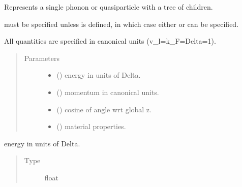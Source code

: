 \documentclass[letterpaper,10pt,english]{sphinxmanual}
\begin{document}
\begin{fulllineitems}
\label{\detokenize{code_structure:scdc.particle.Particle}}
Represents a single phonon or quasiparticle with a tree of children.

 must be specified unless  is defined, in
which case either  or  can be specified.

All quantities are specified in canonical units (v\_l=k\_F=Delta=1).
\begin{quote}\begin{description}
\item[{Parameters}] \leavevmode\begin{itemize}
\item {} 
 (\sphinxstyleliteralemphasis{\sphinxupquote{, }}) \textendash{} energy in units of Delta.

\item {} 
 (\sphinxstyleliteralemphasis{\sphinxupquote{, }}) \textendash{} momentum in canonical units.

\item {} 
 () \textendash{} cosine of angle wrt global z.

\item {} 
 () \textendash{} material properties.

\end{itemize}

\end{description}\end{quote}

\begin{fulllineitems}
\label{\detokenize{code_structure:scdc.particle.Particle.energy}}
energy in units of Delta.
\begin{quote}\begin{description}
\item[{Type}] \leavevmode
float


\end{description}
\end{quote}
\end{fulllineitems}
\end{fulllineitems}
\end{document}
